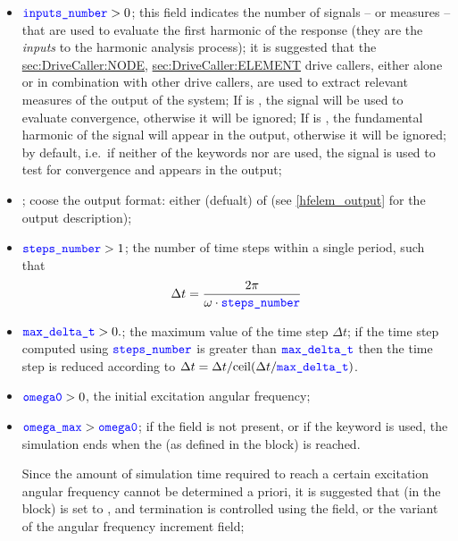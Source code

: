 \begin{itemize}
\item $\textcolor{blue}{\texttt{inputs\_number}} > 0$;
this field indicates the number of signals -- or measures -- that are used to evaluate the first harmonic of the response
(they are the \emph{inputs} to the harmonic analysis process);
it is suggested that the
\hyperref{\kw{node}}{\kw{node} (see Section~}{)}{sec:DriveCaller:NODE},
\hyperref{\kw{element}}{\kw{element} (see Section~}{)}{sec:DriveCaller:ELEMENT}
drive callers, either alone or in combination with other drive callers, are used to extract relevant measures of the output of the system;
If  is , the signal will be used to evaluate convergence, otherwise it will be ignored;
If  is , the fundamental harmonic of the signal will appear in the output, otherwise it will be ignored;
by default, i.e.\ if neither of the keywords  nor  are used, the signal is used to test for convergence and appears in the output;

\item {}; coose the output format: either  (defualt) of  (see
\ref{hfelem_output} for the output description);

\item $\textcolor{blue}{\texttt{steps\_number}} > 1$; the number of time steps within a single period, such that
\begin{align*}
	\Delta t = \frac{2 \pi}{\omega \cdot \textcolor{blue}{\texttt{steps\_number}}}
\end{align*}

\item $\textcolor{blue}{\texttt{max\_delta\_t}} > 0.$; the maximum value of the time step $\Delta t$; 
if the time step computed using $\textcolor{blue}{\texttt{steps\_number}}$ is greater
than $\textcolor{blue}{\texttt{max\_delta\_t}}$ then the time step is reduced according to 
$\Delta t = \Delta t / \mathrm{ceil}(\Delta t / \textcolor{blue}{\texttt{max\_delta\_t}})$.

\item $\textcolor{blue}{\texttt{omega0}} > 0$, the initial excitation angular frequency;

\item $\textcolor{blue}{\texttt{omega\_max}} > \textcolor{blue}{\texttt{omega0}}$; if the  field is not present, or if the keyword  is used, the simulation ends when the  (as defined in the  block) is reached.

Since the amount of simulation time required to reach a certain excitation angular frequency cannot be determined a priori, it is suggested that  (in the  block) is set to , and termination is controlled using the  field, or the  variant of the angular frequency increment field;


\end{itemize}

